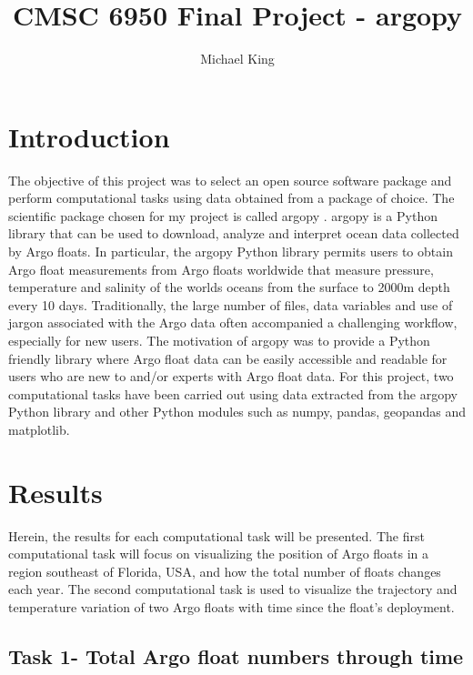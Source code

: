 \documentclass{article}
\title{CMSC 6950 Final Project - argopy}
\author{Michael King}
\begin{document}
\maketitle

\section{Introduction}

The objective of this project was to select an open source software package and perform computational tasks using data obtained from a package of choice. The scientific package chosen for my project is called argopy \cite{maze2020argopy}. argopy is a Python library that can be used to download, analyze and interpret ocean data collected by Argo floats. In particular, the argopy Python library permits users to obtain Argo float measurements from Argo floats worldwide that measure pressure, temperature and salinity of the worlds oceans from the surface to 2000m depth every 10 days. Traditionally, the large number of files, data variables and use of jargon associated with the Argo data often accompanied a challenging workflow, especially for new users. The motivation of argopy was to provide a Python friendly library where Argo float data can be easily accessible and readable for users who are new to and/or experts with Argo float data. For this project, two computational tasks have been carried out using data extracted from the argopy Python library and other Python modules such as numpy, pandas, geopandas and matplotlib. 

    

\section{Results}

Herein, the results for each computational task will be presented. The first computational task will focus on visualizing the position of Argo floats in a region southeast of Florida, USA,  and how the total number of floats changes each year. The second computational task is used to visualize the trajectory and temperature variation of two Argo floats with time since the float's deployment.

\subsection{Task 1- Total Argo float numbers through time}
\end{document}
